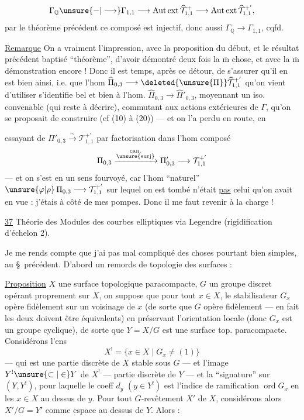 
\[
\Gamma_{\mathbb Q}\unsure{-|\longrightarrow}\Gamma_{1,1}
\longrightarrow \operatorname{Aut\,ext}\widehat{\mathcal T}_{1,1}^{+}
\longrightarrow \operatorname{Aut\,ext}\widehat{\mathcal T}_{1,1}^{+'},
\]
par le théorème précédent ce composé est injectif, donc aussi
$\Gamma_{\mathbb Q}\longrightarrow\Gamma_{1,1}$, cqfd.

\uline{Remarque} On a vraiment l'impression, avec la proposition du début, et
le résultat précédent baptisé ``théorème'', d'avoir démontré deux fois
la $\overline{\mathrm m}$ chose, et avec la $\overline{\mathrm m}$ démonstration
encore ! Donc il est temps, après ce détour, de s'assurer qu'il en est
bien ainsi, i.e. que l'hom
$\widehat{\Pi}_{0,3}\longrightarrow\deleted{\unsure{\Pi}}\widehat{\mathcal T}_{1,1}^{+'}$ qu'on vient d'utiliser
s'identifie bel et bien à l'hom.
$\widehat{\Pi}_{0,3}\longrightarrow\widehat{\Pi}'_{0,3}$,
moyennant un iso. convenable (qui reste à décrire),
commutant aux actions extérieures de $\Gamma$,
qu'on se proposait de construire (cf (10) à (20)) --- et on l'a
perdu en route, en


essayant de 
$\Pi'_{0,3}\xrightarrow{\sim}\mathcal T_{1,1}^{+'}$ par
factorisation dans l'hom composé
\[
\Pi_{0,3}\xrightarrow{\substack{\mathrm{can.}\\\unsure{\mathrm{surj}}}}
\Pi'_{0,3}\longrightarrow\mathcal T_{1,1}^{+'}
\]
--- et on s'est en un sens fourvoyé, car l'hom ``naturel''
$\unsure{\varphi|\rho}\,\Pi_{0,3}\longrightarrow\mathcal T_{1,1}^{+'}$
sur lequel on est tombé n'était \uline{pas}  celui qu'on avait
en vue : j'étais à côté de mes pompes. Donc il me faut revenir à la charge !


\uline{37} Théorie des Modules des courbes elliptiques via Legendre
(rigidification d'échelon 2). \unsure{)}

Je me rends compte que j'ai pas mal compliqué des choses pourtant bien
simples, au \S\ précédent. D'abord un remords de topologie des surfaces :

\uline{Proposition} 
$X$ une surface topologique\unsure{${}^{*}$} paracompacte,
$G$ un groupe discret opérant proprement sur $X$, on suppose que pour tout
$x\in X$, le stabilisateur $G_x$ opère fidèlement sur un voisinage de $x$
(de sorte que $G$ opère fidèlement --- en fait les deux doivent être
équivalents) en préservant l'orientation locale (donc $G_x$ est
un groupe cyclique), de sorte que $Y=X/G$ est une surface top. paracompacte.
Considérons l'ens
\[
X^{!}=\{x\in X\mid G_x\ne(1)\}
\]
--- qui est une partie discrète de $X$ stable sous $G$ --- et l'image
$Y^{!}\unsure{\subset|\in}Y$ de $X^{!}$ --- partie discrète de $Y$ --- et
la ``signature'' sur $(Y,Y^{!})$, pour laquelle le coeff $d_y$ $(y\in Y^{!})$
est l'indice de ramification $\operatorname{ord}G_x$ en les
$x\in X$ au dessus de $y$. Pour tout $G$-revêtement $X'$ de $X$, considérons
alors $X'/G=Y'$ comme espace au dessus de $Y$. Alors :

